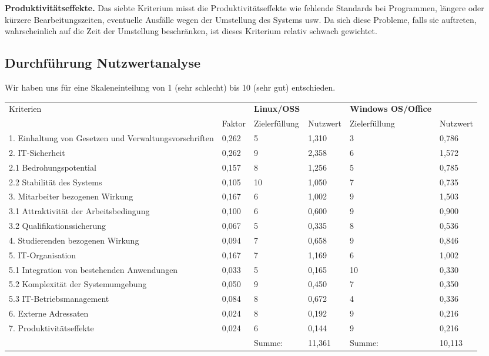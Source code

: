 \documentclass[12pt,utf8]{scrartcl}
\begin{document}
\textbf{Produktivitätseffekte.} Das siebte Kriterium misst die Produktivitätseffekte wie fehlende Standards bei Programmen, längere oder kürzere Bearbeitungszeiten, eventuelle Ausfälle wegen der Umstellung des Systems usw. Da sich diese Probleme, falls sie auftreten, wahrscheinlich auf die Zeit der Umstellung beschränken, ist dieses Kriterium relativ schwach gewichtet. 

\newpage
\subsection*{Durchführung Nutzwertanalyse}

Wir haben uns für eine Skaleneinteilung von 1 (sehr schlecht) bis 10 (sehr gut) entschieden. 

\begin{table}[h]
\centering
\begin{tabular}{|p{5cm}|p{1cm}|p{}|p{2cm}|p{}|p{2cm}|}
\hline
Kriterien & & \textbf{Linux/OSS} & & \textbf{Windows OS/Office} & \\
 & Faktor & Zielerfüllung & Nutzwert & Zielerfüllung & Nutzwert \\
\hline
1. Einhaltung von Gesetzen und Verwaltungsvorschriften & 0,262 & 5 & 1,310 & 3 & 0,786 \\
\hline
2. IT-Sicherheit & 0,262 & 9 & 2,358 & 6 & 1,572 \\
\hline
2.1 Bedrohungspotential & 0,157 & 8 & 1,256 & 5 & 0,785 \\
\hline
2.2 Stabilität des Systems & 0,105 & 10 & 1,050 & 7 & 0,735 \\
\hline
3. Mitarbeiter bezogenen Wirkung & 0,167 & 6 & 1,002 & 9 & 1,503 \\
\hline
3.1 Attraktivität der Arbeitsbedingung & 0,100 & 6 & 0,600 & 9 & 0,900 \\
\hline
3.2 Qualifikationssicherung & 0,067 & 5 & 0,335 & 8 & 0,536 \\
\hline
4. Studierenden bezogenen Wirkung & 0,094 & 7 & 0,658 & 9 & 0,846 \\
\hline
5. IT-Organisation & 0,167 & 7 & 1,169 & 6 & 1,002 \\
\hline
5.1 Integration von bestehenden Anwendungen & 0,033 & 5 & 0,165 & 10 & 0,330 \\
\hline
5.2 Komplexität der Systemumgebung & 0,050 & 9 & 0,450 & 7 & 0,350 \\
\hline
5.3 IT-Betriebsmanagement & 0,084 & 8 & 0,672 & 4 & 0,336 \\
\hline
6. Externe Adressaten & 0,024 & 8 & 0,192 & 9 & 0,216 \\
\hline
7. Produktivitätseffekte & 0,024 & 6 & 0,144 & 9 & 0,216 \\
\hline
 & & Summe: & 11,361 & Summe: & 10,113 \\
\hline
\end{tabular}
\end{table}
\end{document}
